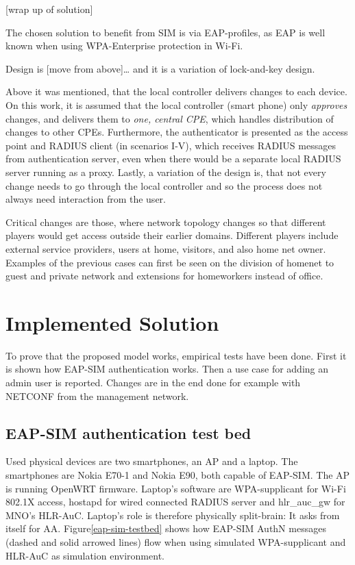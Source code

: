 \documentclass[12pt,a4paper,english]{tutthesis}
\begin{document}
[wrap up of solution]

The chosen solution to benefit from SIM is via EAP-profiles, as EAP
is well known when using WPA-Enterprise protection in Wi-Fi.

Design is [move from above]\ldots{}
and it is a variation of lock-and-key design.

Above it was mentioned, that the local controller delivers changes to each
device. On this work, it is assumed that the local controller (smart
phone) only \emph{approves} changes,
and delivers them to \emph{one, central CPE}, 
which handles distribution of changes to other CPEs.
Furthermore, the authenticator is presented as the access point and
RADIUS client (in scenarios I-V), which receives RADIUS messages from
authentication server, even when there would be a separate local RADIUS server
running as a proxy.
Lastly, a variation of the design is, that not every change needs to go
 through  the local controller and so the process does not always need
interaction from the user.



Critical changes are those, where network topology changes so
that different players would get access outside their earlier domains.
Different players include external service providers, users at home,
visitors, and also home net owner. Examples of the previous cases can first be
seen on the division of homenet to guest and private network and
extensions for homeworkers instead of office.


\chapter{Implemented Solution}
\label{sec-5}


To prove that the proposed model works, empirical tests have been done.
First it is shown how EAP-SIM authentication works. Then a use case for
adding an admin user is reported. Changes are in the end done 
for example with NETCONF from the management network.

\section{EAP-SIM authentication test bed}
\label{sec-5-1}



Used physical devices are two smartphones, an AP and a laptop.
The smartphones are Nokia E70-1 and Nokia E90, both capable of EAP-SIM.
The AP is running OpenWRT firmware.  
Laptop's software are WPA-supplicant for Wi-Fi 802.1X access,
hostapd for wired connected RADIUS server and hlr\_auc\_gw for MNO's
HLR-AuC. Laptop's role is therefore physically split-brain: It asks from itself for AA. 
Figure\ref{eap-sim-testbed} shows how EAP-SIM AuthN messages (dashed
and solid arrowed lines) flow when using 
simulated WPA-supplicant and HLR-AuC as simulation environment.
\end{document}
